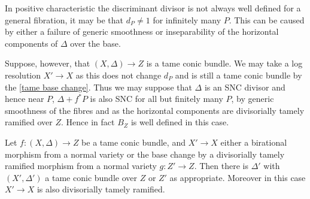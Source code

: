\documentclass[a4paper,12pt]{book}
\begin{document}
In positive characteristic the discriminant divisor is not always well defined for a general fibration, it may be that $d_{P} \neq 1$ for infinitely many $P$. This can be caused by either a failure of generic smoothness or inseparability of the horizontal components of $\Delta$ over the base.

Suppose, however, that $(X,\Delta) \to Z$ is a tame conic bundle. We may take a log resolution $X' \to X$ as this does not change $d_{P}$ and is still a tame conic bundle by the \autoref{tame base change}. Thus we may suppose that $\Delta$ is an SNC divisor and hence near $P$, $\Delta+f^{*}P$ is also SNC for all but finitely many $P$, by generic smoothness of the fibres and as the horizontal components are divisorially tamely ramified over $Z$. Hence in fact $B_{Z}$ is well defined in this case.

\begin{lemma}\label{tame base change}
	Let $f\colon (X,\Delta) \to Z$ be a tame conic bundle, and $X' \to X$ either a birational morphism from a normal variety or the base change by a divisorially tamely ramified morphism from a normal variety $g\colon Z' \to Z$. Then there is $\Delta'$ with $(X',\Delta')$ a tame conic bundle over $Z$ or $Z'$ as appropriate. Moreover in this case $X' \to X$ is also divisorially tamely ramified.
\end{lemma}
\end{document}
